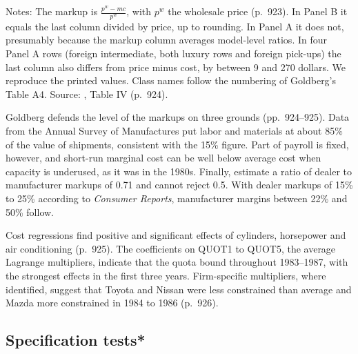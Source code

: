 \begin{table}[htbp]
\smallskip
\begin{minipage}{0.92\linewidth}
\footnotesize Notes: The markup is $\frac{p^w - mc}{p^w}$, with $p^w$ the wholesale price (p.~923). In Panel B
it equals the last column divided by price, up to rounding. In Panel A it does not, presumably because the
markup column averages model-level ratios. In four Panel A rows (foreign intermediate, both luxury rows and
foreign pick-ups) the last column also differs from price minus cost, by between 9 and 270 dollars. We reproduce
the printed values. Class names follow the numbering of Goldberg's Table A4. Source: \citet{Goldberg1995},
Table IV (p.~924).
\end{minipage}
\end{table}

Goldberg defends the level of the markups on three grounds (pp.~924--925).
Data from the Annual Survey of Manufactures put labor and materials at about 85\% of the value of shipments,
consistent with the 15\% figure. Part of payroll is fixed, however, and short-run marginal cost can be well
below average cost when capacity is underused, as it was in the 1980s. Finally, \citet{BresnahanReiss1985}
estimate a ratio of dealer to manufacturer markups of 0.71 and cannot reject 0.5. With dealer markups of 15\%
to 25\% according to \emph{Consumer Reports}, manufacturer margins between 22\% and 50\% follow.

Cost regressions find positive and significant effects of cylinders, horsepower and air conditioning (p.~925).
The coefficients on QUOT1 to QUOT5, the average Lagrange multipliers, indicate that the quota bound throughout
1983--1987, with the strongest effects in the first three years. Firm-specific multipliers, where identified,
suggest that Toyota and Nissan were less constrained than average and Mazda more constrained in 1984 to 1986
(p.~926).

\subsection{Specification tests*}\label{sec:08-goldberg-tests}

